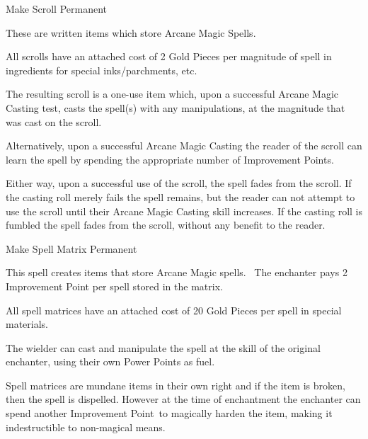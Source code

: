 %
%


\begin{rpg-spell}
{Make Scroll}
{Permanent}

These are written items which store Arcane Magic Spells.

All scrolls have an attached cost of 2 Gold Pieces per magnitude of spell in ingredients for special inks/parchments, etc.

The resulting scroll is a one-use item which, upon a successful Arcane Magic Casting test, casts the spell(s) with any manipulations, at the magnitude that was cast on the scroll.

Alternatively, upon a successful Arcane Magic Casting the reader of the scroll can learn the spell by spending the appropriate number of Improvement Points.

Either way, upon a successful use of the scroll, the spell fades from the scroll. If the casting roll merely fails the spell remains, but the reader can not attempt to use the scroll until their Arcane Magic Casting skill increases. If the casting roll is fumbled the spell fades from the scroll, without any benefit to the reader.
\end{rpg-spell}


\begin{rpg-spell}
{Make Spell Matrix}
{Permanent}

This spell creates items that store Arcane Magic spells. 
The enchanter pays 2 Improvement Point per spell stored in the matrix.

All spell matrices have an attached cost of 20 Gold Pieces per spell in special materials.

The wielder can cast and manipulate the spell at the skill of the original enchanter, using their own Power Points as fuel.

Spell matrices are mundane items in their own right and if the item is broken, then the spell is dispelled. However at the time of enchantment the enchanter can spend another Improvement Point to magically harden the item, making it indestructible to non-magical means. %
\end{rpg-spell}



